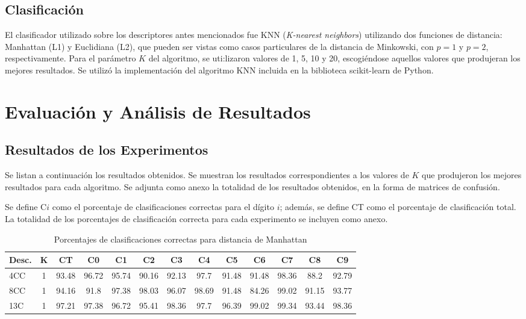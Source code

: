 \documentclass[12pt]{article}
\begin{document}
\subsection{Clasificación}

El clasificador utilizado sobre los descriptores antes mencionados fue KNN
(\emph{K-nearest neighbors}) utilizando dos funciones de distancia: Manhattan
(L1) y Euclidiana (L2), que pueden ser vistas como casos particulares de la
distancia de Minkowski, con $p=1$ y $p=2$, respectivamente. Para el parámetro
$K$ del algoritmo, se uti:lizaron valores de 1, 5, 10 y 20, escogiéndose
aquellos valores que produjeran los mejores resultados. Se utilizó la
implementación del algoritmo KNN incluida en la biblioteca scikit-learn de
Python.

\section{Evaluación y Análisis de Resultados}

\subsection{Resultados de los Experimentos}

Se listan a continuación los resultados obtenidos. Se muestran los resultados
correspondientes a los valores de $K$ que produjeron los mejores resultados para
cada algoritmo. Se adjunta como anexo la totalidad de los resultados obtenidos,
en la forma de matrices de confusión.

Se define C$i$ como el porcentaje de clasificaciones correctas para el dígito
$i$; además, se define CT como el porcentaje de clasificación total. La
totalidad de los porcentajes de clasificación correcta para cada experimento se
incluyen como anexo.

\begin{table}[H]
\begin{tabular}{|l|c|c|c|c|c|c|c|c|c|c|c|c|}
\hline
\textbf{Desc.}&\textbf{K}&\textbf{CT}&\textbf{C0}&\textbf{C1}&\textbf{C2}&\textbf{C3}&\textbf{C4}&\textbf{C5}&\textbf{C6}&\textbf{C7}&\textbf{C8}&\textbf{C9}\\
\hline
4CC&1&93.48&96.72&95.74&90.16&92.13&97.7&91.48&91.48&98.36&88.2&92.79\\
\hline
8CC&1&94.16&91.8&97.38&98.03&96.07&98.69&91.48&84.26&99.02&91.15&93.77\\
\hline
13C&1&97.21&97.38&96.72&95.41&98.36&97.7&96.39&99.02&99.34&93.44&98.36\\
\hline
\end{tabular}
\caption{Porcentajes de clasificaciones correctas para distancia de Manhattan}
\end{table}
\end{document}
